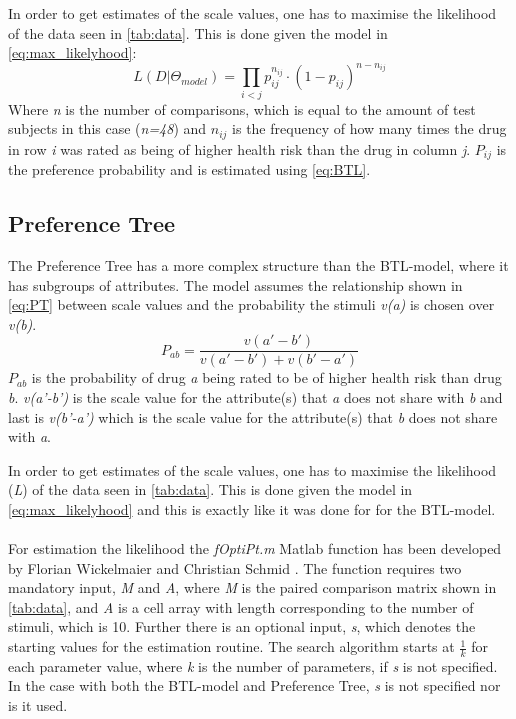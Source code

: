 In order to get estimates of the scale values, one has to maximise the likelihood of the data seen in \autoref{tab:data}. This is done given the model in \autoref{eq:max_likelyhood}: 
%
\begin{equation}
L(D|\Theta_{model}) = \prod_{i<j} p_{ij} ^{n_{ij}}\cdot(1- p_{ij})^{n-n_{ij}}
\label{eq:max_likelyhood}
\end{equation}
\noindent 
%
Where \textit{n} is the number of comparisons, which is equal to the amount of test subjects in this case (\textit{n=48}) and $n_{ij}$ is the frequency of how many times the drug in row \textit{i} was rated as being of higher health risk than the drug in column \textit{j}. $P_{ij}$ is the preference probability and is estimated using \autoref{eq:BTL}. 

\subsection*{Preference Tree}
%
The Preference Tree has a more complex structure than the BTL-model, where it has subgroups of attributes. The model assumes the relationship shown in \autoref{eq:PT} between scale values and the probability the stimuli \textit{v(a)} is chosen over \textit{v(b)}.
%
\begin{equation}
P_{ab} =\frac{v(a'-b')}{v(a'-b')+v(b'-a')} 
\label{eq:PT}
\end{equation}
\noindent
%
$P_{ab}$ is the probability of drug \textit{a} being rated to be of higher health risk than drug \textit{b}. \textit{v(a'-b')} is the scale value for the attribute(s) that \textit{a} does not share with \textit{b} and last is \textit{v(b'-a')} which is the scale value for the attribute(s) that \textit{b} does not share with \textit{a}.

In order to get estimates of the scale values, one has to maximise the likelihood (\textit{L}) of the data seen in \autoref{tab:data}. This is done given the model in \autoref{eq:max_likelyhood} and this is exactly like it was done for for the BTL-model. 
\\\\
For estimation the likelihood the \textit{fOptiPt.m} Matlab function has been developed by Florian Wickelmaier and Christian Schmid \parencite{Wickelmaier2004}. The function requires two mandatory input, \textit{M} and \textit{A}, where \textit{M} is the paired comparison matrix shown in \autoref{tab:data}, and \textit{A} is a cell array with length corresponding to the number of stimuli, which is 10. Further there is an optional input, \textit{s}, which denotes the starting values for the estimation routine. The search algorithm starts at $\frac{1}{k}$ for each parameter value, where \textit{k} is the number of parameters, if \textit{s} is not specified. In the case with both the BTL-model and Preference Tree, \textit{s} is not specified nor is it used.
\vfill